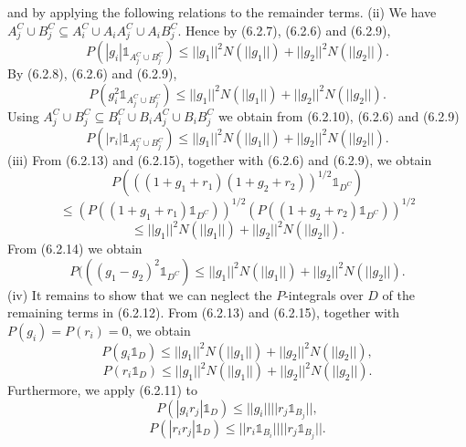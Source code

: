  and by applying the following relations to the remainder terms. (ii) We have $A_j^C \cup B_j^C \subseteq A_i^C \cup A_i A_j^C \cup A_i B_j^C$. Hence by (6.2.7), (6.2.6) and (6.2.9), \begin{equation*}  P(|g_i| \mathbb{1}_{A_j^C \cup B_j^C}) \leq ||g_1||^2 N(||g_1||) + ||g_2||^2 N(||g_2||). \end{equation*} By (6.2.8), (6.2.6) and (6.2.9), \begin{equation*}  P(g_i^2 \mathbb{1}_{A_j^C \cup B_j^C}) \leq ||g_1||^2 N(||g_1||) + ||g_2||^2 N(||g_2||). \end{equation*} Using $A_j^C \cup B_j^C \subseteq B_i^C \cup B_i A_j^C \cup B_i B_j^C$ we obtain from (6.2.10), (6.2.6) and (6.2.9) \begin{equation*}  P(|r_i| \mathbb{1}_{A_j^C \cup B_j^C}) \leq ||g_1||^2 N(||g_1||) + ||g_2||^2 N(||g_2||). \end{equation*} (iii) From (6.2.13) and (6.2.15), together with (6.2.6) and (6.2.9), we obtain \begin{equation*} P(((1+g_1 +r_1)(1+g_2 +r_2))^{1/2} \mathbb{1}_{D^C}) \end{equation*} \begin{equation*} \leq (P((1+g_1 +r_1) \mathbb{1}_{D^C}))^{1/2} (P((1 + g_2 + r_2) \mathbb{1}_{D^C}))^{1/2} \end{equation*} \begin{equation*} \leq ||g_1||^2 N(||g_1||) + ||g_2||^2 N(||g_2||). \end{equation*} From (6.2.14) we obtain \begin{equation*} P(((g_1 - g_2)^2 \mathbb{1}_{D^C}) \leq ||g_1||^2 N(||g_1||) + ||g_2||^2 N(||g_2||). \end{equation*} (iv) It remains to show that we can neglect the $P$-integrals over $D$ of the remaining terms in (6.2.12). From (6.2.13) and (6.2.15), together with $P(g_i) = P(r_i) = 0$, we obtain \begin{equation*}  P(g_i \mathbb{1}_D) \leq ||g_1||^2 N(||g_1||) + ||g_2||^2 N(||g_2||), \end{equation*} \begin{equation*}  P(r_i \mathbb{1}_D) \leq ||g_1||^2 N(||g_1||) + ||g_2||^2 N(||g_2||). \end{equation*} Furthermore, we apply (6.2.11) to \begin{equation*}  P(|g_i r_j| \mathbb{1}_D) \leq ||g_i|| ||r_j \mathbb{1}_{B_j}||, \end{equation*} \begin{equation*}  P(|r_i r_j| \mathbb{1}_D) \leq ||r_i \mathbb{1}_{B_i}|| ||r_j \mathbb{1}_{B_j}||. \end{equation*} 